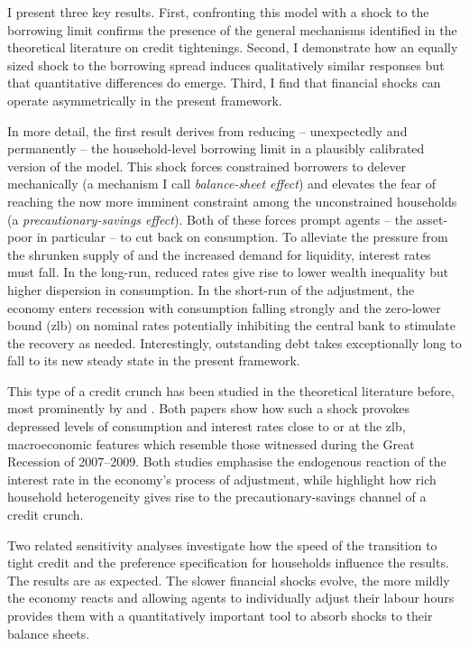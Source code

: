\documentclass[a4paper,12pt]{article} %
\numberwithin{equation}{section} %
\numberwithin{figure}{section}
\numberwithin{table}{section}
\begin{document}
I present three key results. First, confronting this model with a shock to the borrowing limit confirms the presence of the general mechanisms identified in the theoretical literature on credit tightenings. Second, I demonstrate how an equally sized shock to the borrowing spread induces qualitatively similar responses but that quantitative differences do emerge. Third, I find that financial shocks can operate asymmetrically in the present framework.

In more detail, the first result derives from reducing -- unexpectedly and permanently -- the household-level borrowing limit in a plausibly calibrated version of the model. This shock forces constrained borrowers to delever mechanically (a mechanism I call \textit{balance-sheet effect}) and elevates the fear of reaching the now more imminent constraint among the unconstrained households (a \textit{precautionary-savings effect}). Both of these forces prompt agents -- the asset-poor in particular -- to cut back on consumption. To alleviate the pressure from the shrunken supply of and the increased demand for liquidity, interest rates must fall. In the long-run, reduced rates give rise to lower wealth inequality but higher dispersion in consumption. In the short-run of the adjustment, the economy enters recession with consumption falling strongly and the zero-lower bound (\Gls{zlb}) on nominal rates potentially inhibiting the central bank to stimulate the recovery as needed. Interestingly, outstanding debt takes exceptionally long to fall to its new steady state in the present framework.

This type of a credit crunch has been studied in the theoretical literature before, most prominently by \textcite{egg2012} and \textcite{gl2017}. Both papers show how such a shock provokes depressed levels of consumption and interest rates close to or at the \Gls{zlb}, macroeconomic features which resemble those witnessed during the Great Recession of 2007--2009. Both studies emphasise the endogenous reaction of the interest rate in the economy's process of adjustment, while \textcite{gl2017} highlight how rich household heterogeneity gives rise to the precautionary-savings channel of a credit crunch.

Two related sensitivity analyses investigate how the speed of the transition to tight credit and the preference specification for households influence the results. The results are as expected. The slower financial shocks evolve, the more mildly the economy reacts and allowing agents to individually adjust their labour hours provides them with a quantitatively important tool to absorb shocks to their balance sheets.
\end{document}
